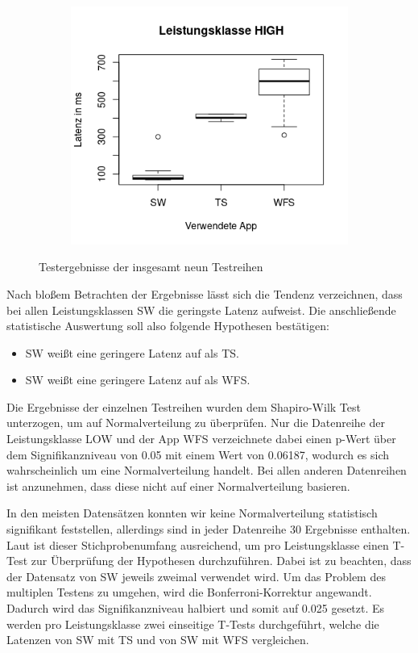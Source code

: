 \begin{figure}[h!]
\begin{subfigure}[b]{0.5\textwidth}
\end{subfigure}
\begin{subfigure}[b]{0.5\textwidth}
\includegraphics[width=\textwidth]{img/boxplothigh.png}
\end{subfigure}
\caption{Testergebnisse der insgesamt neun Testreihen}
\label{boxplots}
\end{figure}

Nach bloßem Betrachten der Ergebnisse lässt sich die Tendenz verzeichnen, dass bei allen Leistungsklassen SW die geringste Latenz aufweist. Die anschließende statistische Auswertung soll also folgende Hypothesen bestätigen:

\begin{itemize}
\item SW weißt eine geringere Latenz auf als TS.
\item SW weißt eine geringere Latenz auf als WFS.
\end{itemize}

Die Ergebnisse der einzelnen Testreihen wurden dem Shapiro-Wilk Test unterzogen, um auf Normalverteilung zu überprüfen. Nur die Datenreihe der Leistungsklasse LOW und der App WFS verzeichnete dabei einen p-Wert über dem Signifikanzniveau von 0.05 mit einem Wert von 0.06187, wodurch es sich wahrscheinlich um eine Normalverteilung handelt. Bei allen anderen Datenreihen ist anzunehmen, dass diese nicht auf einer Normalverteilung basieren.

In den meisten Datensätzen konnten wir keine Normalverteilung statistisch signifikant feststellen, allerdings sind in jeder Datenreihe 30 Ergebnisse enthalten. Laut \cite{IEEEexample:Georges2007} ist dieser Stichprobenumfang ausreichend, um pro Leistungsklasse einen T-Test zur Überprüfung der Hypothesen durchzuführen. Dabei ist zu beachten, dass der Datensatz von SW jeweils zweimal verwendet wird. Um das Problem des multiplen Testens zu umgehen, wird die Bonferroni-Korrektur angewandt. Dadurch wird das Signifikanzniveau halbiert und somit auf 0.025 gesetzt. Es werden pro Leistungsklasse zwei einseitige T-Tests durchgeführt, welche die Latenzen von SW mit TS und von SW mit WFS vergleichen.

